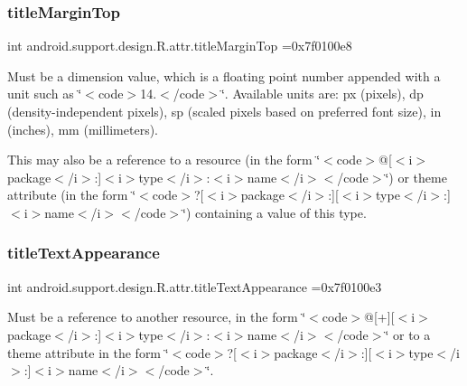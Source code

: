 \subsubsection{\texorpdfstring{title\+Margin\+Top}{titleMarginTop}}
{\footnotesize\ttfamily int android.\+support.\+design.\+R.\+attr.\+title\+Margin\+Top =0x7f0100e8\hspace{0.3cm}{\ttfamily [static]}}

Must be a dimension value, which is a floating point number appended with a unit such as \char`\"{}$<$code$>$14.\+5sp$<$/code$>$\char`\"{}. Available units are\+: px (pixels), dp (density-\/independent pixels), sp (scaled pixels based on preferred font size), in (inches), mm (millimeters). 

This may also be a reference to a resource (in the form \char`\"{}$<$code$>$@\mbox{[}$<$i$>$package$<$/i$>$\+:\mbox{]}$<$i$>$type$<$/i$>$\+:$<$i$>$name$<$/i$>$$<$/code$>$\char`\"{}) or theme attribute (in the form \char`\"{}$<$code$>$?\mbox{[}$<$i$>$package$<$/i$>$\+:\mbox{]}\mbox{[}$<$i$>$type$<$/i$>$\+:\mbox{]}$<$i$>$name$<$/i$>$$<$/code$>$\char`\"{}) containing a value of this type. \mbox{\label{classandroid_1_1support_1_1design_1_1R_1_1attr_ad430580335b0f55e7508d87c4a68b4d8}} 
\subsubsection{\texorpdfstring{title\+Text\+Appearance}{titleTextAppearance}}
{\footnotesize\ttfamily int android.\+support.\+design.\+R.\+attr.\+title\+Text\+Appearance =0x7f0100e3\hspace{0.3cm}{\ttfamily [static]}}

Must be a reference to another resource, in the form \char`\"{}$<$code$>$@\mbox{[}+\mbox{]}\mbox{[}$<$i$>$package$<$/i$>$\+:\mbox{]}$<$i$>$type$<$/i$>$\+:$<$i$>$name$<$/i$>$$<$/code$>$\char`\"{} or to a theme attribute in the form \char`\"{}$<$code$>$?\mbox{[}$<$i$>$package$<$/i$>$\+:\mbox{]}\mbox{[}$<$i$>$type$<$/i$>$\+:\mbox{]}$<$i$>$name$<$/i$>$$<$/code$>$\char`\"{}. \mbox{\label{classandroid_1_1support_1_1design_1_1R_1_1attr_a08459d5006ee4c06955351a45afbcbf0}} 
